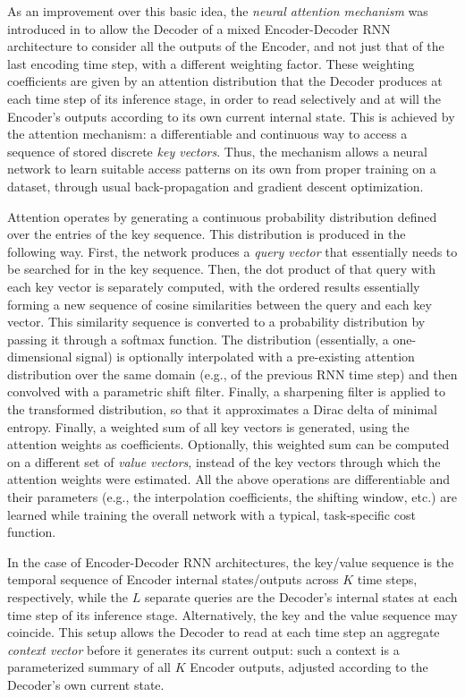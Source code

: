 \documentclass[preprint,review,12pt]{elsarticle}
\begin{document}
As an improvement over this basic idea, the \textit{neural attention mechanism} was introduced in \cite{bahdanau} to allow the Decoder of a mixed Encoder-Decoder RNN architecture to consider all the outputs of the Encoder, and not just that of the last encoding time step, with a different weighting factor. These weighting coefficients are given by an attention distribution that the Decoder produces at each time step of its inference stage, in order to read selectively and at will the Encoder's outputs according to its own current internal state. This is achieved by the attention mechanism: a differentiable and continuous way to access a sequence of stored discrete \textit{key vectors}. Thus, the mechanism allows a neural network to learn suitable access patterns on its own from proper training on a dataset, through usual back-propagation and gradient descent optimization.

Attention operates by generating a continuous probability distribution defined over the entries of the key sequence. This distribution is produced in the following way. First, the network produces a \textit{query vector} that essentially needs to be searched for in the key sequence. Then, the dot product of that query with each key vector is separately computed, with the ordered results essentially forming a new sequence of cosine similarities between the query and each key vector. This similarity sequence is converted to a probability distribution by passing it through a softmax function. The distribution (essentially, a one-dimensional signal) is optionally interpolated with a pre-existing attention distribution over the same domain (e.g., of the previous RNN time step) and then convolved with a parametric shift filter. Finally, a sharpening filter is applied to the transformed distribution, so that it approximates a Dirac delta of minimal entropy. Finally, a weighted sum of all key vectors is generated, using the attention weights as coefficients. Optionally, this weighted sum can be computed on a different set of \textit{value vectors}, instead of the key vectors through which the attention weights were estimated. All the above operations are differentiable and their parameters (e.g., the interpolation coefficients, the shifting window, etc.) are learned while training the overall network with a typical, task-specific cost function.

In the case of Encoder-Decoder RNN architectures, the key/value sequence is the temporal sequence of Encoder internal states/outputs across $K$ time steps, respectively, while the $L$ separate queries are the Decoder's internal states at each time step of its inference stage. Alternatively, the key and the value sequence may coincide. This setup allows the Decoder to read at each time step an aggregate \textit{context vector} before it generates its current output: such a context is a parameterized summary of all $K$ Encoder outputs, adjusted according to the Decoder's own current state.
\end{document}
